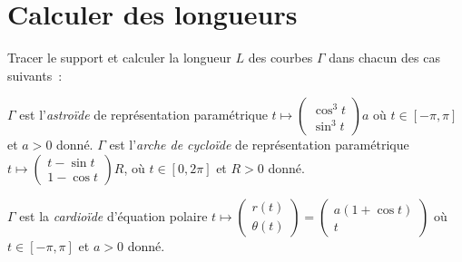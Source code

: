 \documentclass{tp_um}
\begin{document}
        \section{Calculer des longueurs}
\newpage

        \exo{} Tracer le support et calculer la longueur $L$ des courbes $\Gamma$ dans chacun des cas suivants~:
        \begin{modenumerate}
        \item  $\Gamma$ est l'\emph{astroïde} de représentation paramétrique $t \mapsto \begin{pmatrix}
                \cos^3t\\
                \sin^3t
            \end{pmatrix}a$ où $t\in [-\pi, \pi]$ et $a>0$ donné.
            \moditem{*}  $\Gamma$ est l'\emph{arche de cycloïde} de représentation paramétrique $t \mapsto \begin{pmatrix}
                t-\sin t\\
                1-\cos t
            \end{pmatrix} R$, où $t \in[0,2\pi]$ et  $R >0 $ donné.
        \item  $\Gamma$ est la \emph{cardioïde} d'équation polaire $t \mapsto\begin{pmatrix} r(t) \\ \theta(t)\end{pmatrix} = \begin{pmatrix}a(1+\cos t) \\ t\end{pmatrix}$  où $t\in [ -\pi,\pi ] $ et  $a>0$ donné.
        \end{modenumerate}


        
\end{document}
